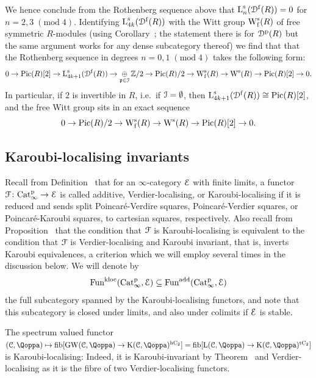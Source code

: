 \begin{example}
We hence conclude from the Rothenberg sequence above %
that $\operatorname L_n^{\mathrm{s}}({\mathcal D}^{\mathrm{f}}(R)) = 0$ for $n=2,3 \;(\mathrm{mod}\; 4)$. Identifying $\operatorname L_{4k}^{\mathrm{s}}({\mathcal D}^{\mathrm{f}}(R))$ with the Witt group $\operatorname W^{\mathrm{s}}_{\mathrm{f}}(R)$ of free symmetric $R$-modules (using 
Corollary~\;; the statement there is for ${\mathcal D}^{\mathrm{p}}(R)$ but the same argument works for any dense subcategory thereof)
we find that that the Rothenberg sequence in degrees $n=0,1 \;(\mathrm{mod}\; 4)$ takes the following form:
\[
0 \to \operatorname{Pic}(R)[2] \to \operatorname L_{4k+1}^{\mathrm{s}}({\mathcal D}^{\mathrm{f}}(R)) \to \displaystyle\mathop{\oplus}\limits_{\mathfrak{p} \in \mathcal{I}} \mathbb{Z}/2 \to \operatorname{Pic}(R)/2 \to\operatorname W^{\mathrm{s}}_{\mathrm{f}}(R) \to \operatorname W^{\mathrm{s}}(R) \to \operatorname{Pic}(R)[2] \to 0 .
\]
In particular, if $2$ is invertible in $R$, i.e.\ if $\mathcal{I} = \emptyset$, then $\operatorname L_{4k+1}^{\mathrm{s}}({\mathcal D}^{\mathrm{f}}(R)) \cong \operatorname{Pic}(R)[2]$, and the free Witt group sits in an exact sequence
\[
0 \to \operatorname{Pic}(R)/2 \to \operatorname W^{\mathrm{s}}_{\mathrm{f}}(R) \to \operatorname W^{\mathrm{s}}(R) \to \operatorname{Pic}(R)[2] \to 0.
\]
\end{example}



\subsection{Karoubi-localising invariants}
\label{subsection:localising-invariants}%

Recall from Definition~ that for an $\infty$-category $\mathcal{E}$ with finite limits, a functor $\mathcal{F}\colon \mathrm{Cat}^{\mathrm p}_\infty\to\mathcal{E}$ is called additive, Verdier-localising, or Karoubi-localising if it is reduced and sends split Poincaré-Verdire squares, Poincaré-Verdier squares, or Poincaré-Karoubi squares, to cartesian squares, respectively.
Also recall from Proposition~ that the condition that $\mathcal{F}$ is Karoubi-localising is equivalent to the condition that $\mathcal{F}$ is Verdier-localising and Karoubi invariant, that is, inverts Karoubi equivalences, %
a criterion which we will employ several times in the discussion below.
We will denote by 
\[
\operatorname{Fun}^{\mathrm{kloc}}(\mathrm{Cat}^{\mathrm p}_\infty,\mathcal{E}) \subseteq \operatorname{Fun}^{\mathrm{add}}(\mathrm{Cat}^{\mathrm p}_\infty,\mathcal{E})
\]
the full subcategory spanned by the Karoubi-localising functors, and note that this subcategory is closed under limits, and also under colimits if $\mathcal{E}$ is stable.

\begin{example}
The spectrum valued functor $(\C,\QF) \mapsto \fib[\GW(\C,\QF) \to \K(\C,\QF)^{\hC}] = \fib[\L(\C,\QF) \to \K(\C,\QF)^{\tC}]$ is Karoubi-localising: Indeed, it is Karoubi-invariant by Theorem~ and Verdier-localising as it is the fibre of two Verdier-localising functors.
\end{example}



